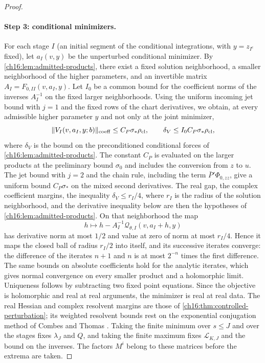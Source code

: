 \begin{proof}
\paragraph{Step 3: conditional minimizers.}
For each stage $I$ (an initial segment of the conditional integrations, with $y=z_{I^c}$ fixed), let $a_I(v,y)$ be the unperturbed conditional minimizer. By \cref{ch16:lem:admitted-products}, there exist a fixed solution neighborhood, a smaller neighborhood of the higher parameters, and an invertible matrix $A_I=F_{0,II}(v,a_I,y)$. Let $I_0$ be a common bound for the coefficient norms of the inverses $A_I^{-1}$ on the fixed larger neighborhoods. Using the uniform incoming jet bound with $j=1$ and the fixed rows of the chart derivatives, we obtain, at every admissible higher parameter $y$ and not only at the joint minimizer,
\begin{equation}\label{ch17:eq:conditional-force-bound}
 \lVert V_I(v,a_I,y;b)\rVert_{\mathrm{coeff}}\le C_P\sigma_*\rho_{\mathrm{cl}},\qquad\delta_V\le I_0C_P\sigma_*\rho_{\mathrm{cl}},
\end{equation}
where $\delta_V$ is the bound on the preconditioned conditional forces of \cref{ch16:lem:admitted-products}. The constant $C_P$ is evaluated on the larger products at the preliminary bound $\sigma_0$ and includes the conversion from $z$ to $u$. The jet bound with $j=2$ and the chain rule, including the term $\bar P'\Phi_{0,zz}$, give a uniform bound $C_P\sigma_*$ on the mixed second derivatives. The real gap, the complex coefficient margins, the inequality $\delta_V\le r_I/4$, where $r_I$ is the radius of the solution neighborhood, and the derivative inequality below are then the hypotheses of \cref{ch16:lem:admitted-products}. On that neighborhood the map
\[
 h\longmapsto h-A_I^{-1}\mathcal Q_{\theta,I}(v,a_I+h,y)
\]
has derivative norm at most $1/2$ and value at zero of norm at most $r_I/4$. Hence it maps the closed ball of radius $r_I/2$ into itself, and its successive iterates converge: the difference of the iterates $n+1$ and $n$ is at most $2^{-n}$ times the first difference. The same bounds on absolute coefficients hold for the analytic iterates, which gives normal convergence on every smaller product and a holomorphic limit. Uniqueness follows by subtracting two fixed point equations. Since the objective is holomorphic and real at real arguments, the minimizer is real at real data. The real Hessian and complex resolvent margins are those of \cref{ch16:thm:controlled-perturbation}; its weighted resolvent bounds rest on the exponential conjugation method of Combes and Thomas \cite{CombesThomas1973}. Taking the finite minimum over $s\le J$ and over the stages fixes $\lambda_J$ and $Q$, and taking the finite maximum fixes $\mathcal L_{K,J}$ and the bound on the inverses. The factors $M^i$ belong to these matrices before the extrema are taken.


\end{proof}
